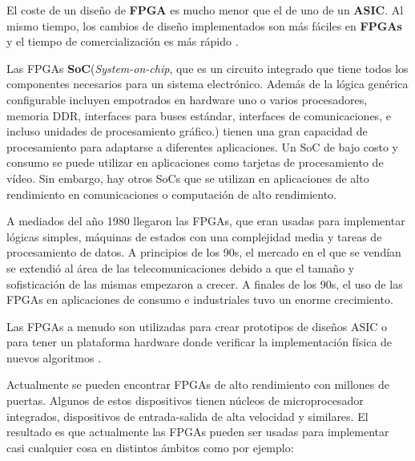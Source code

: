 El coste de un diseño de \textbf{FPGA} es mucho menor que el de uno de un \textbf{ASIC}. Al mismo tiempo, los cambios de diseño implementados 
son más fáciles en \textbf{FPGAs} y el tiempo de comercialización es más rápido \cite{maxfield2}.

Las FPGAs \textbf{SoC}(\textit{System-on-chip}, que es un circuito integrado que tiene todos los componentes necesarios para un sistema electrónico.
Además de la lógica genérica configurable incluyen empotrados en hardware uno o varios procesadores, memoria DDR, interfaces para buses 
estándar, interfaces de comunicaciones, e incluso unidades de procesamiento gráfico.) tienen una gran capacidad de procesamiento para 
adaptarse a diferentes aplicaciones. Un SoC de bajo costo y consumo se puede utilizar en aplicaciones como tarjetas de procesamiento de 
vídeo. Sin embargo, hay otros SoCs que se utilizan en aplicaciones de alto rendimiento en comunicaciones o computación de alto rendimiento.

A mediados del año 1980 llegaron las FPGAs, que eran usadas para implementar lógicas simples, máquinas de estados con una complejidad media 
y tareas de procesamiento de datos. A principios de los 90s, el mercado en el que se vendían se extendió al área de las telecomunicaciones 
debido a que el tamaño y sofisticación de las mismas empezaron a crecer. A finales de los 90s, el uso de las FPGAs en aplicaciones de consumo 
e industriales tuvo un enorme crecimiento.

Las FPGAs a menudo son utilizadas para crear prototipos de diseños ASIC o para tener un plataforma hardware donde verificar la implementación 
física de nuevos algoritmos \cite{maxfield1}. 

Actualmente se pueden encontrar FPGAs de alto rendimiento con millones de puertas. Algunos de estos dispositivos tienen núcleos de 
microprocesador integrados, dispositivos de entrada-salida de alta velocidad y similares. El resultado es que actualmente las FPGAs pueden ser 
usadas para implementar casi cualquier cosa en distintos ámbitos como por ejemplo:

